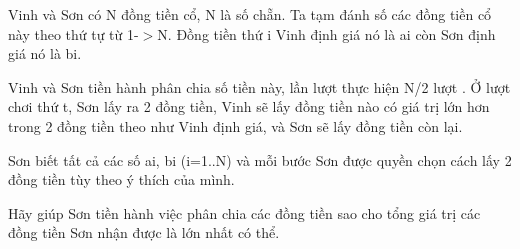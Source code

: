Vinh và Sơn có N đồng tiền cổ, N là số chẵn. Ta tạm đánh số các đồng tiền cổ này theo thứ tự từ 1-$>$N. Đồng tiền thứ i Vinh định giá nó là ai còn Sơn định giá nó là bi.

Vinh và Sơn tiền hành phân chia số tiền này, lần lượt thực hiện N/2 lượt . Ở lượt chơi thứ t, Sơn lấy ra 2 đồng tiền, Vinh sẽ lấy đồng tiền nào có giá trị lớn hơn trong 2 đồng tiền theo như Vinh định giá, và Sơn sẽ lấy đồng tiền còn lại.

Sơn biết tất cả các số ai, bi (i=1..N) và mỗi bước Sơn được quyền chọn cách lấy 2 đồng tiền tùy theo ý thích của mình.

Hãy giúp Sơn tiền hành việc phân chia các đồng tiền sao cho tổng giá trị các đồng tiền Sơn nhận được là lớn nhất có thể.